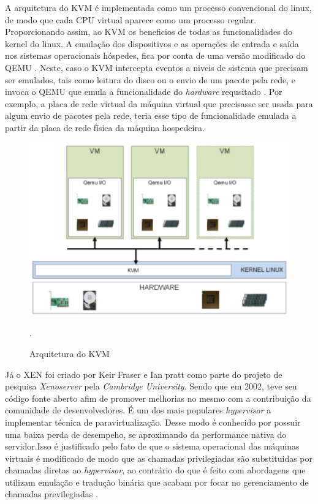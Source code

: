 A arquitetura do KVM é implementada como um processo convencional do linux, de modo que cada CPU virtual aparece como um processo regular. Proporcionando assim, ao KVM os beneficios de todas as funcionalidades do kernel do linux\cite{redhatkvm}. A emulação dos dispositivos e as operações de entrada e saída nos sistemas operacionais hóspedes, fica por conta de uma versão modificado do QEMU \cite{redhatkvm,qumranet}. Neste, caso o KVM intercepta eventos a niveis de sistema que precisam ser emulados, tais como leitura do disco ou o envio de um pacote pela rede, e invoca o QEMU que emula a funcionalidade do \textit{hardware} requsitado \cite{rasmusson}. Por exemplo, a placa de rede virtual da máquina virtual que precisasse ser usada para algum envio de pacotes pela rede, teria esse tipo de funcionalidade emulada a partir da placa de rede física da máquina hospedeira. 

\begin{figure}[!htb]
\centering
\includegraphics [keepaspectratio=true,scale=0.6]{figuras/kvm_arc.eps}
\caption{Arquitetura do KVM}
\cite{fabiano}.
\label{kvm_arc}
\end{figure}

Já o XEN foi criado por Keir Fraser e Ian pratt como parte do projeto de pesquisa \textit{Xenoserver} pela \textit{Cambridge University}. Sendo que em 2002, teve seu código fonte aberto afim de promover melhorias no mesmo com a contribuição da comunidade de desenvolvedores. É um dos mais populares \textit{hypervisor} a implementar técnica de paravirtualização\cite{xen}. Desse modo é conhecido por possuir uma baixa perda de desempeho, se aproximando da performance nativa do servidor\cite{walters}.Isso é justificado pelo fato de que o sistema operacional das máquinas virtuais é modificado de modo que as chamadas privilegiadas são substituidas por chamadas diretas ao \textit{hypervisor}, ao contrário do que é feito com abordagens que utilizam emulação e tradução binária que acabam por focar no gerenciamento de chamadas previlegiadas \cite{redhatkvm}. 

